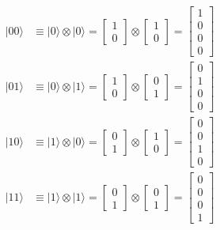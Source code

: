 \documentclass[fleqn]{article}
\begin{document}
\[
  \begin{aligned}
    |00\rangle &\equiv |0\rangle\otimes|0\rangle
    = \begin{bmatrix}1\\0\end{bmatrix} \otimes \begin{bmatrix}1\\0\end{bmatrix}
    = \begin{bmatrix}1\\0\\0\\0\end{bmatrix}
  \\[1em]
    |01\rangle &\equiv |0\rangle\otimes|1\rangle
    = \begin{bmatrix}1\\0\end{bmatrix} \otimes \begin{bmatrix}0\\1\end{bmatrix}
    = \begin{bmatrix}0\\1\\0\\0\end{bmatrix}
  \\[1em]
    |10\rangle &\equiv |1\rangle\otimes|0\rangle
    = \begin{bmatrix}0\\1\end{bmatrix} \otimes \begin{bmatrix}1\\0\end{bmatrix}
    = \begin{bmatrix}0\\0\\1\\0\end{bmatrix}
  \\[1em]
    |11\rangle &\equiv |1\rangle\otimes|1\rangle
    = \begin{bmatrix}0\\1\end{bmatrix} \otimes \begin{bmatrix}0\\1\end{bmatrix}
    = \begin{bmatrix}0\\0\\0\\1\end{bmatrix}
  \end{aligned}
\]
\end{document}
